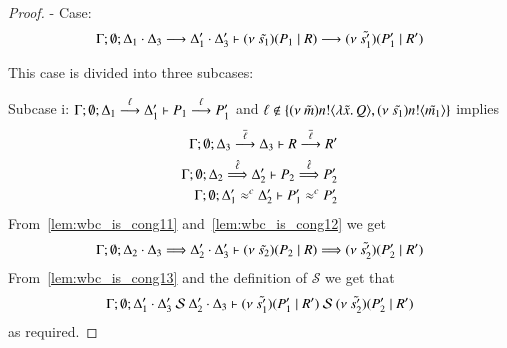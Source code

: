 \begin{proof}

	\noi - Case:
	\[
		\Gamma; \emptyset; \Delta_1 \cdot \Delta_3 \stackrel{}{\longrightarrow} \Delta_1' \cdot \Delta_3' \vdash (\nu\ \tilde{s_1})(P_1 \;|\; R) \stackrel{}{\longrightarrow} (\nu\ \tilde{s_1'})(P_1' \;|\; R')
	\]

	\noi This case is divided into three subcases:

	\noi Subcase i: $\Gamma; \emptyset; \Delta_1 \stackrel{\ell}{\longrightarrow} \Delta_1' \vdash P_1 \stackrel{\ell}{\longrightarrow} P_1'$
	and $\ell \notin \{(\nu\ \tilde{m}) n ! \langle \lambda \tilde{x}.\,Q \rangle, (\nu\ \tilde{s_1}) n ! \langle \tilde{m_1} \rangle\}$ implies
%
	\begin{eqnarray}
		\Gamma; \emptyset; \Delta_3 \stackrel{\overline{\ell}}{\longrightarrow} \Delta_3 \vdash R \stackrel{\overline{\ell}}{\longrightarrow} R' \label{lem:wbc_is_cong11} \\
		\Gamma; \emptyset; \Delta_2 \stackrel{\hat{\ell}}{\Longrightarrow} \Delta_2' \vdash P_2 \stackrel{\hat{\ell}}{\Longrightarrow} P_2' \label{lem:wbc_is_cong12}\\
		\Gamma; \emptyset; \Delta_1' \approx^{c} \Delta_2' \vdash P_1' \approx^{c} P_2' \label{lem:wbc_is_cong13}
	\end{eqnarray}
%
	\noi From~\ref{lem:wbc_is_cong11} and~\ref{lem:wbc_is_cong12} we get
	\[
		\Gamma; \emptyset; \Delta_2 \cdot \Delta_3 \stackrel{}{\Longrightarrow} \Delta_2' \cdot \Delta_3' \vdash (\nu\ \tilde{s_2})(P_2 \;|\; R) \stackrel{}{\Longrightarrow} (\nu\ \tilde{s_2'})(P_2' \;|\; R')
	\]
%
	\noi From~\ref{lem:wbc_is_cong13} and the definition of $\mathcal{S}$ we get that
	\[
		\Gamma; \emptyset; \Delta_1' \cat \Delta_3'\ \mathcal{S}\ \Delta_2' \cat \Delta_3 \proves \newsp{\tilde{s_1'}}{P_1' \Par R'}\ \mathcal{S}\ \newsp{\tilde{s_2'}}{P_2' \Par R'}
	\]
	\noi as required.


\end{proof}
